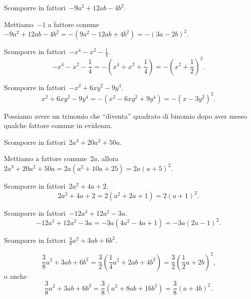\begin{exrig}
 \begin{esempio}
Scomporre in fattori~$-9a^{2}+12{ab}-4b^{2}$.

Mettiamo~$-1$ a fattore comune~$-9a^{2}+12ab-4b^{2}=-(9a^{2}-12{ab}+4b^{2})=-(3a-2b)^{2}$.
 \end{esempio}

 \begin{esempio}
Scomporre in fattori~$-x^{4}-x^{2}-\frac{1}{4}$.
\[-x^{4}-x^{2}-\frac{1}{4}=-\left(x^{4}+x^{2}+\frac{1}{4}\right)=-\left(x^{2}+\frac{1}{2}\right)^{2}.\]
 \end{esempio}

 \begin{esempio}
Scomporre in fattori~$-x^{2}+6xy^{2}-9y^{4}$.
\[x^{2}+6xy^{2}-9y^{4}=-\left(x^{2}-6xy^{2}+9y^{4}\right)=-\left(x-3y^{2}\right)^{2}.\]
 \end{esempio}
\end{exrig}

Possiamo avere un trinomio che ``diventa'' quadrato di binomio dopo aver messo qualche fattore comune in evidenza.

\begin{exrig}
 \begin{esempio}
Scomporre in fattori~$2a^{3}+20a^{2}+50a$.

Mettiamo a fattore comune~$2a$, allora~$2a^{3}+20a^{2}+50a=2a(a^{2}+10a+25)=2a(a+5)^{2}$.
 \end{esempio}

 \begin{esempio}
Scomporre in fattori~$2a^{2}+4a+2$.
\[2a^{2}+4a+2=2\left(a^{2}+2a+1\right)=2(a+1)^{2}.\]
 \end{esempio}

 \begin{esempio}
Scomporre in fattori~$-12a^{3}+12a^{2}-3a$.
\[-12a^{3}+12a^{2}-3a=-3a\left(4a^{2}-4a+1\right)=-3a(2a-1)^{2}.\]
 \end{esempio}

 \begin{esempio}
Scomporre in fattori~$\frac{3}{8}a^{2}+3ab+6b^{2}$.

\[\frac{3}{8}a^{2}+3ab+6b^{2}=\frac{3}{2}\left(\frac{1}{4}a^{2}+2ab+4b^{2}\right)=\frac{3}{2}\left(\frac{1}{2}a+2b\right)^{2}\text{,}\]
o anche
\[\frac{3}{8}a^{2}+3ab+6b^{2}=\frac{3}{8}\left(a^{2}+8ab+16b^{2} \right)=\frac{3}{8}\left(a+4b\right)^{2}.\]
 \end{esempio}
\end{exrig}
\ovalbox{\risolvii \ref{ese:16.1}, \ref{ese:16.2}, \ref{ese:16.3}, \ref{ese:16.4}, \ref{ese:16.5}, \ref{ese:16.6}, \ref{ese:16.7}, \ref{ese:16.8}, \ref{ese:16.9}, \ref{ese:16.10},\ref{ese:16.11}, \ref{ese:16.12}}

